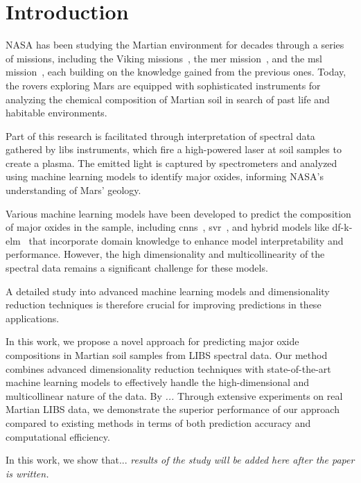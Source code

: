 \section{Introduction}\label{sec:introduction}

NASA has been studying the Martian environment for decades through a series of missions, including the Viking missions~\cite{marsnasagov_vikings}, the \gls{mer} mission~\cite{marsnasagov_observer, marsnasagov_spirit_opportunity}, and the \gls{msl} mission~\cite{marsnasagov_msl}, each building on the knowledge gained from the previous ones.
Today, the rovers exploring Mars are equipped with sophisticated instruments for analyzing the chemical composition of Martian soil in search of past life and habitable environments.

Part of this research is facilitated through interpretation of spectral data gathered by \gls{libs} instruments, which fire a high-powered laser at soil samples to create a plasma.
The emitted light is captured by spectrometers and analyzed using machine learning models to identify major oxides, informing NASA's understanding of Mars' geology.

Various machine learning models have been developed to predict the composition of major oxides in the sample, including \glspl{cnn}~\cite{yang_laser-induced_2022, yangConvolutionalNeuralNetwork2022}, \gls{svr}~\cite{rezaei_dimensionality_reduction}, and hybrid models like \gls{df}-\gls{k-elm}~\cite{song_DF-K-ELM} that incorporate domain knowledge to enhance model interpretability and performance.
However, the high dimensionality and multicollinearity of the spectral data remains a significant challenge for these models.

A detailed study into advanced machine learning models and dimensionality reduction techniques is therefore crucial for improving predictions in these applications.

In this work, we propose a novel approach for predicting major oxide compositions in Martian soil samples from LIBS spectral data. Our method combines advanced dimensionality reduction techniques with state-of-the-art machine learning models to effectively handle the high-dimensional and multicollinear nature of the data. 
By \textit{...}
Through extensive experiments on real Martian LIBS data, we demonstrate the superior performance of our approach compared to existing methods in terms of both prediction accuracy and computational efficiency.


In this work, we show that... \textit{results of the study will be added here after the paper is written.}

